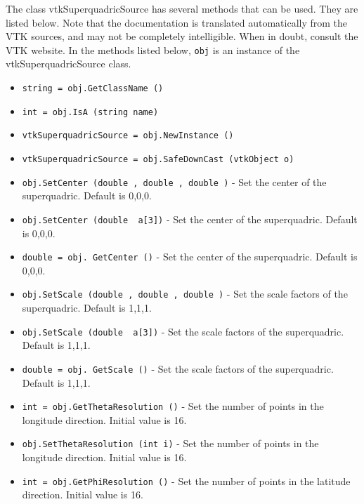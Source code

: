 The class vtkSuperquadricSource has several methods that can be used.
  They are listed below.
Note that the documentation is translated automatically from the VTK sources,
and may not be completely intelligible.  When in doubt, consult the VTK website.
In the methods listed below, \verb|obj| is an instance of the vtkSuperquadricSource class.
\begin{itemize}
\item  \verb|string = obj.GetClassName ()|

\item  \verb|int = obj.IsA (string name)|

\item  \verb|vtkSuperquadricSource = obj.NewInstance ()|

\item  \verb|vtkSuperquadricSource = obj.SafeDownCast (vtkObject o)|

\item  \verb|obj.SetCenter (double , double , double )| -  Set the center of the superquadric. Default is 0,0,0.

\item  \verb|obj.SetCenter (double  a[3])| -  Set the center of the superquadric. Default is 0,0,0.

\item  \verb|double = obj. GetCenter ()| -  Set the center of the superquadric. Default is 0,0,0.

\item  \verb|obj.SetScale (double , double , double )| -  Set the scale factors of the superquadric. Default is 1,1,1.

\item  \verb|obj.SetScale (double  a[3])| -  Set the scale factors of the superquadric. Default is 1,1,1.

\item  \verb|double = obj. GetScale ()| -  Set the scale factors of the superquadric. Default is 1,1,1.

\item  \verb|int = obj.GetThetaResolution ()| -  Set the number of points in the longitude direction. Initial value is 16.

\item  \verb|obj.SetThetaResolution (int i)| -  Set the number of points in the longitude direction. Initial value is 16.

\item  \verb|int = obj.GetPhiResolution ()| -  Set the number of points in the latitude direction. Initial value is 16.


\end{itemize}
